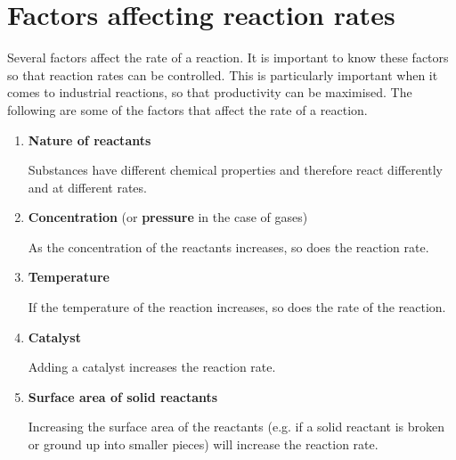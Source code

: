 



\section{Factors affecting reaction rates}
\label{sec:reactionrates:factors affecting}
Several factors affect the rate of a reaction. It is important to know
these factors so that reaction rates can be controlled. This is particularly important when it comes to industrial reactions, so that productivity can be maximised. The following are some of the factors that affect the rate of a reaction.

\begin{enumerate}
\item{\textbf{Nature of reactants}}

Substances have different chemical properties and therefore react differently and at different rates.

\item{\textbf{Concentration} (or \textbf{pressure} in the case of gases)}

As the concentration of the reactants increases, so does the reaction rate.

\item{\textbf{Temperature}}

If the temperature of the reaction increases, so does the rate of the reaction. 
	
\item{\textbf{Catalyst}} 

Adding a catalyst increases the reaction rate.

\item{\textbf{Surface area of solid reactants}} 

Increasing the surface area of the reactants (e.g. if a solid reactant is broken or ground up into smaller pieces) will increase the reaction rate. 
\end{enumerate}  

